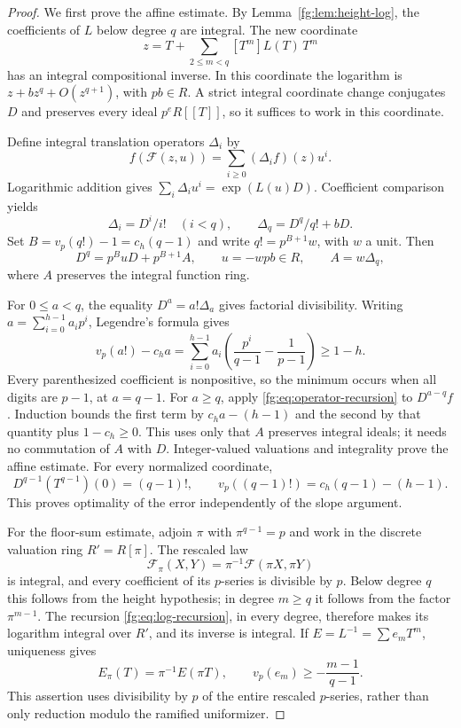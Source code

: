 \begin{proof}
We first prove the affine estimate. By Lemma~\ref{fg:lem:height-log},
the coefficients of $L$ below degree $q$ are integral. The new coordinate
\[
 z=T+\sum_{2\le m<q}[T^m]L(T)\,T^m
\]
has an integral compositional inverse. In this coordinate the logarithm
is $z+bz^q+O(z^{q+1})$, with $pb\in R$. A strict integral coordinate
change conjugates $D$ and preserves every ideal $p^eR[[T]]$, so it
suffices to work in this coordinate.

Define integral translation operators $\Delta_i$ by
\[
 f(\mathcal F(z,u))=\sum_{i\ge0}(\Delta_i f)(z)u^i.
\]
Logarithmic addition gives
$\sum_i\Delta_i u^i=\exp(L(u)D)$. Coefficient comparison yields
\[
 \Delta_i=D^i/i!\quad(i<q),\qquad
 \Delta_q=D^q/q!+bD.
\]
Set $B=v_p(q!)-1=c_h(q-1)$ and write $q!=p^{B+1}w$, with $w$ a unit.
Then
\begin{equation}\label{fg:eq:operator-recursion}
 D^q=p^BuD+p^{B+1}A,\qquad u=-wpb\in R,
 \qquad A=w\Delta_q,
\end{equation}
where $A$ preserves the integral function ring.

For $0\le a<q$, the equality $D^a=a!\Delta_a$ gives factorial
divisibility. Writing $a=\sum_{i=0}^{h-1}a_i p^i$, Legendre's formula
gives
\[
 v_p(a!)-c_ha
 =\sum_{i=0}^{h-1}a_i
       \left(\frac{p^i}{q-1}-\frac1{p-1}\right)\ge1-h.
\]
Every parenthesized coefficient is nonpositive, so the minimum occurs
when all digits are $p-1$, at $a=q-1$.
For $a\ge q$, apply \eqref{fg:eq:operator-recursion} to $D^{a-q}f$.
Induction bounds the first term by $c_ha-(h-1)$ and the second by
that quantity plus $1-c_h\ge0$. This uses only that $A$ preserves
integral ideals; it needs no commutation of $A$ with $D$.
Integer-valued valuations and integrality prove the affine estimate.
For every normalized coordinate,
\[
 D^{q-1}(T^{q-1})(0)=(q-1)!,\qquad
 v_p((q-1)!)=c_h(q-1)-(h-1).
\]
This proves optimality of the error independently of the slope argument.

For the floor-sum estimate, adjoin $\pi$ with $\pi^{q-1}=p$ and work
in the discrete valuation ring $R'=R[\pi]$. The rescaled law
\[
 \mathcal F_\pi(X,Y)=\pi^{-1}\mathcal F(\pi X,\pi Y)
\]
is integral, and every coefficient of its $p$-series is divisible by
$p$. Below degree $q$ this follows from the height hypothesis; in
degree $m\ge q$ it follows from the factor $\pi^{m-1}$.
The recursion \eqref{fg:eq:log-recursion}, in every degree, therefore
makes its logarithm integral over $R'$, and its inverse is integral.
If $E=L^{-1}=\sum e_mT^m$, uniqueness gives
\[
 E_\pi(T)=\pi^{-1}E(\pi T),\qquad
 v_p(e_m)\ge-\frac{m-1}{q-1}.
\]
This assertion uses divisibility by $p$ of the entire rescaled
$p$-series, rather than only reduction modulo the ramified uniformizer.


\end{proof}
